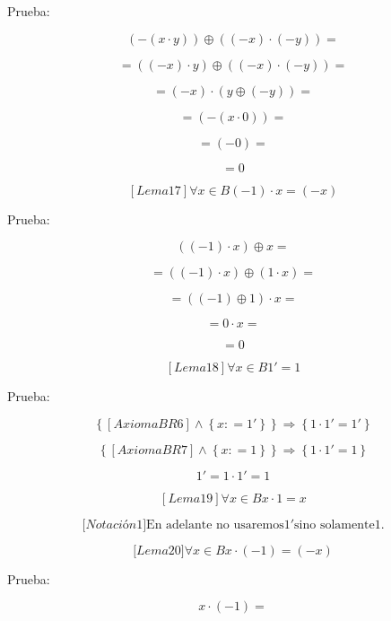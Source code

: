 \documentclass[
]{article}
\begin{document}
\begin{enumerate}
\begin{enumerate}
\begin{enumerate}
      Prueba:

      \[\left( {- \left( {x \cdot y} \right)} \right) \oplus {\left( {\left( {- x} \right) \cdot \left( {- y} \right)} \right) =}\]

      \[{= \left( {\left( {- x} \right) \cdot y} \right)} \oplus {\left( {\left( {- x} \right) \cdot \left( {- y} \right)} \right) =}\]

      \[{= {\left( {- x} \right) \cdot \left( {y \oplus \left( {- y} \right)} \right)}} =\]

      \[{= \left( {- \left( {x \cdot 0} \right)} \right)} =\]

      \[{= \left( {- 0} \right)} =\]

      \[= 0\]

      \[\left\lbrack {{Lema}17} \right\rbrack\forall{x \in B}{{\left( {- 1} \right) \cdot x} = \left( {- x} \right)}\]

      Prueba:

      \[\left( {\left( {- 1} \right) \cdot x} \right) \oplus {x =}\]

      \[{= \left( {\left( {- 1} \right) \cdot x} \right)} \oplus {\left( {1 \cdot x} \right) =}\]

      \[{= {\left( {\left( {- 1} \right) \oplus 1} \right) \cdot x}} =\]

      \[{= {0 \cdot x}} =\]

      \[= 0\]

      \[\left\lbrack {{Lema}18} \right\rbrack\forall{x \in B}1{' = 1}\]

      Prueba:

      \[\left\{ {\left\lbrack {{Axioma}{BR6}} \right\rbrack \land \left\{ {x{: = 1}'} \right\}} \right\}\Rightarrow\left\{ {{1 \cdot 1}{' = 1}'} \right\}\]

      \[\left\{ {\left\lbrack {{Axioma}{BR7}} \right\rbrack \land \left\{ {x{: = 1}} \right\}} \right\}\Rightarrow\left\{ {{1 \cdot 1}{' = 1}} \right\}\]

      \[1{' = {1 \cdot 1}}{' = 1}\]

      \[\left\lbrack {{Lema}19} \right\rbrack\forall{x \in B}{{x \cdot 1} = x}\]

      \[{\lbrack{{Notación}1}\rbrack}\text{En adelante no usaremos}1'\text{sino solamente}1\text{.}\]

      \[{\lbrack{{Lema}20}\rbrack}\forall{x \in B}{{x \cdot \left( {- 1} \right)} = \left( {- x} \right)}\]

      Prueba:

      \[{x \cdot \left( {- 1} \right)} =\]


\end{enumerate}
\end{enumerate}
\end{enumerate}
\end{document}

